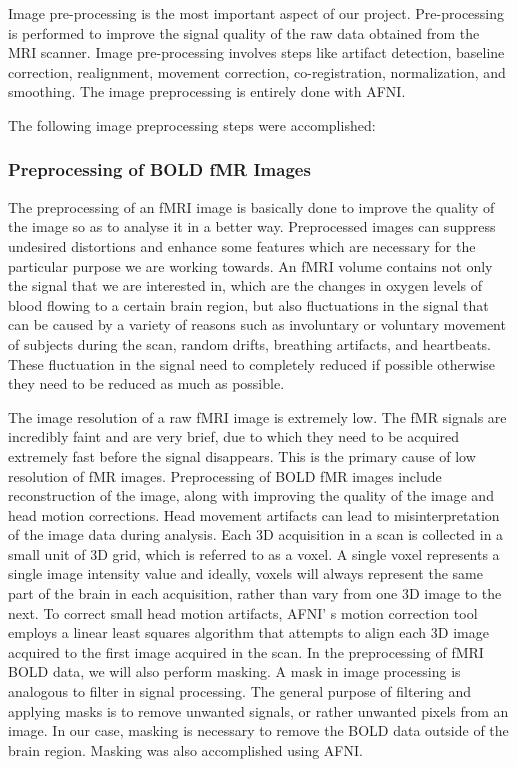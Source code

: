 \documentclass[12pt]{article}
\begin{document}
Image pre-processing is the most important aspect of our project.
Pre-processing is performed to improve the signal quality of the raw
data obtained from the MRI scanner. Image pre-processing involves
steps like artifact detection, baseline correction, realignment,
movement correction, co-registration, normalization, and smoothing.
The image preprocessing is entirely done with AFNI.

The following image preprocessing steps were accomplished:

\subsubsection{Preprocessing of BOLD fMR Images}%
\label{ssub:preprocessing_of_bold_fmr_images}

The preprocessing of an fMRI image is basically done to improve the
quality of the image so as to analyse it in a better way.
Preprocessed images can suppress undesired distortions and enhance
some features which are necessary for the particular purpose we are
working towards. An fMRI volume contains not only the signal that we
are interested in, which are the  changes in oxygen levels of blood
flowing to a certain brain region, but also fluctuations in the signal
that can be caused by a variety of reasons such as involuntary or
voluntary movement of subjects during the scan, random drifts,
breathing artifacts, and heartbeats. These fluctuation in the signal
need to completely reduced if possible otherwise they need to be
reduced as much as possible.

The image resolution of a raw fMRI image is extremely low. The fMR
signals are incredibly faint and are very brief, due to which they
need to be acquired extremely fast before the signal disappears.  This
is the primary cause of low resolution of fMR images. Preprocessing of
BOLD fMR images include reconstruction of the image, along with
improving the quality of the image and head motion corrections.  Head
movement artifacts can lead to misinterpretation of the image data
during analysis.  Each 3D acquisition in a scan is collected in a
small unit of 3D grid, which is referred to as a voxel.  A single
voxel represents a single image intensity value and ideally, voxels
will always represent the same part of the brain in each acquisition,
rather than vary from one 3D image to the next. To correct small head
motion artifacts, AFNI' s motion correction tool employs a linear
least squares algorithm that attempts to align each 3D image acquired
to the first image acquired in the scan. In the preprocessing of fMRI
BOLD data, we will also perform masking. A mask in image processing
is analogous to filter in signal processing. The general purpose of
filtering and applying masks is to remove unwanted signals, or rather
unwanted pixels from an image. In our case, masking is necessary to
remove the BOLD data outside of the brain region. Masking was also
accomplished using AFNI.
\end{document}
